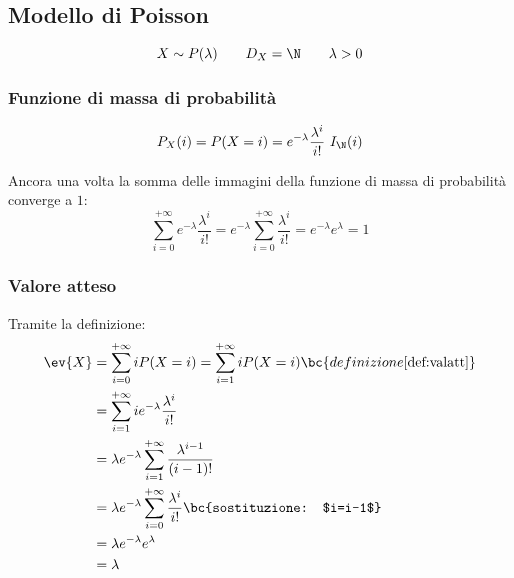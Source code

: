 \subsection{Modello di Poisson}
\begin{equation*}
	X\sim P(\lambda) \qquad D_X = \N \qquad \lambda>0
\end{equation*}

\subsubsection{Funzione di massa di probabilità}
\begin{equation*}
	P_X(i) = P(X=i) = e^{-\lambda}\frac{\lambda^i}{i!} ~ I_\N(i)
\end{equation*}

Ancora una volta la somma delle immagini della funzione di massa di probabilità converge a $1$:
\begin{equation} \label{eq:poisummas}
	\sum_{i=0}^{+\infty} e^{-\lambda}\frac{\lambda^i}{i!} = e^{-\lambda}\sum_{i=0}^{+\infty} \frac{\lambda^i}{i!} = e^{-\lambda}e^\lambda = 1
\end{equation}


\subsubsection{Valore atteso}
Tramite la definizione:
\begin{align}
	\ev{X} & = \sum_{i=0}^{+\infty} i P(X=i) = \sum_{i=1}^{+\infty} i P(X=i) \bc{definizione \ref{def:valatt}} \nonumber \\
	       & = \sum_{i=1}^{+\infty} i e^{-\lambda}\frac{\lambda^i}{i!} \label{eq:poinotevolelambda}                      \\
	       & = \lambda e^{-\lambda} \sum_{i=1}^{+\infty} \frac{\lambda^{i-1}}{(i-1)!} \nonumber                          \\
	       & = \lambda e^{-\lambda} \sum_{i=0}^{+\infty}\frac{\lambda^i}{i!} \bc{sostituzione: $i=i-1$} \nonumber        \\
	       & = \lambda e^{-\lambda} e^\lambda \nonumber                                                                  \\
	       & = \lambda
\end{align}


